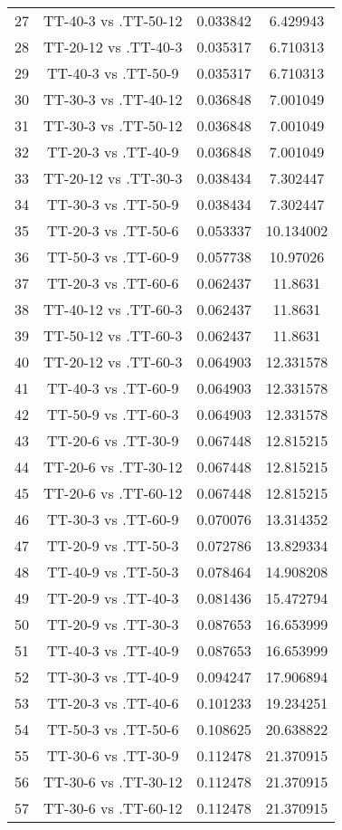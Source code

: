 \documentclass[a4paper,10pt]{article}
\begin{document}
\begin{landscape}
\begin{table}[!htp]
\begin{tabular}{cccc}
27&TT-40-3 vs .TT-50-12&0.033842&6.429943\\
28&TT-20-12 vs .TT-40-3&0.035317&6.710313\\
29&TT-40-3 vs .TT-50-9&0.035317&6.710313\\
30&TT-30-3 vs .TT-40-12&0.036848&7.001049\\
31&TT-30-3 vs .TT-50-12&0.036848&7.001049\\
32&TT-20-3 vs .TT-40-9&0.036848&7.001049\\
33&TT-20-12 vs .TT-30-3&0.038434&7.302447\\
34&TT-30-3 vs .TT-50-9&0.038434&7.302447\\
35&TT-20-3 vs .TT-50-6&0.053337&10.134002\\
36&TT-50-3 vs .TT-60-9&0.057738&10.97026\\
37&TT-20-3 vs .TT-60-6&0.062437&11.8631\\
38&TT-40-12 vs .TT-60-3&0.062437&11.8631\\
39&TT-50-12 vs .TT-60-3&0.062437&11.8631\\
40&TT-20-12 vs .TT-60-3&0.064903&12.331578\\
41&TT-40-3 vs .TT-60-9&0.064903&12.331578\\
42&TT-50-9 vs .TT-60-3&0.064903&12.331578\\
43&TT-20-6 vs .TT-30-9&0.067448&12.815215\\
44&TT-20-6 vs .TT-30-12&0.067448&12.815215\\
45&TT-20-6 vs .TT-60-12&0.067448&12.815215\\
46&TT-30-3 vs .TT-60-9&0.070076&13.314352\\
47&TT-20-9 vs .TT-50-3&0.072786&13.829334\\
48&TT-40-9 vs .TT-50-3&0.078464&14.908208\\
49&TT-20-9 vs .TT-40-3&0.081436&15.472794\\
50&TT-20-9 vs .TT-30-3&0.087653&16.653999\\
51&TT-40-3 vs .TT-40-9&0.087653&16.653999\\
52&TT-30-3 vs .TT-40-9&0.094247&17.906894\\
53&TT-20-3 vs .TT-40-6&0.101233&19.234251\\
54&TT-50-3 vs .TT-50-6&0.108625&20.638822\\
55&TT-30-6 vs .TT-30-9&0.112478&21.370915\\
56&TT-30-6 vs .TT-30-12&0.112478&21.370915\\
57&TT-30-6 vs .TT-60-12&0.112478&21.370915\\

\end{tabular}
\end{table}
\end{landscape}
\end{document}
